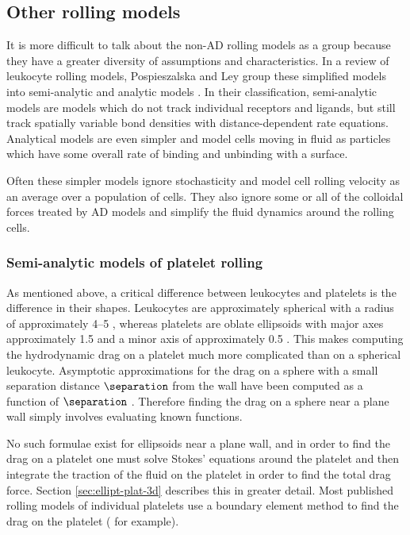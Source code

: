 \subsection{Other rolling models}
\label{sec:other-models}

It is more difficult to talk about the non-AD rolling models as a
group because they have a greater diversity of assumptions and
characteristics. In a review of leukocyte rolling models,
Pospieszalska and Ley group these simplified models into semi-analytic
and analytic models \cite{Pospieszalska2009}. In their classification,
semi-analytic models are models which do not track individual receptors
and ligands, but still track spatially variable bond densities with
distance-dependent rate equations. Analytical models are even simpler
and model cells moving in fluid as particles which have some overall
rate of binding and unbinding with a surface.

Often these simpler models ignore stochasticity and model cell rolling
velocity as an average over a population of cells. They also ignore
some or all of the colloidal forces treated by AD models and simplify
the fluid dynamics around the rolling cells.

\subsubsection{Semi-analytic models of platelet rolling}
\label{sec:semi-model-plat}

As mentioned above, a critical difference between leukocytes and
platelets is the difference in their shapes. Leukocytes are
approximately spherical with a radius of approximately 4--5
, whereas platelets are oblate ellipsoids with major
axes approximately 1.5  and a minor axis of
approximately 0.5 . This makes computing the
hydrodynamic drag on a platelet much more complicated than on a
spherical leukocyte. Asymptotic approximations for the drag on a
sphere with a small separation distance $\separation$ from the wall
have been computed as a function of $\separation$
\cite{Jeffrey1915,Brenner1961,Goldman1967a,Goldman1967b}. Therefore
finding the drag on a sphere near a plane wall simply involves
evaluating known functions.

No such formulae exist for ellipsoids near a plane wall, and in order
to find the drag on a platelet one must solve Stokes' equations around
the platelet and then integrate the traction of the fluid on the
platelet in order to find the total drag force. Section
\ref{sec:ellipt-plat-3d} describes this in greater detail. Most
published rolling models of individual platelets use a boundary
element method to find the drag on the platelet
(\cite{Fitzgibbon2014,Mody2008a,Mody2008b,Wang2013} for example).

